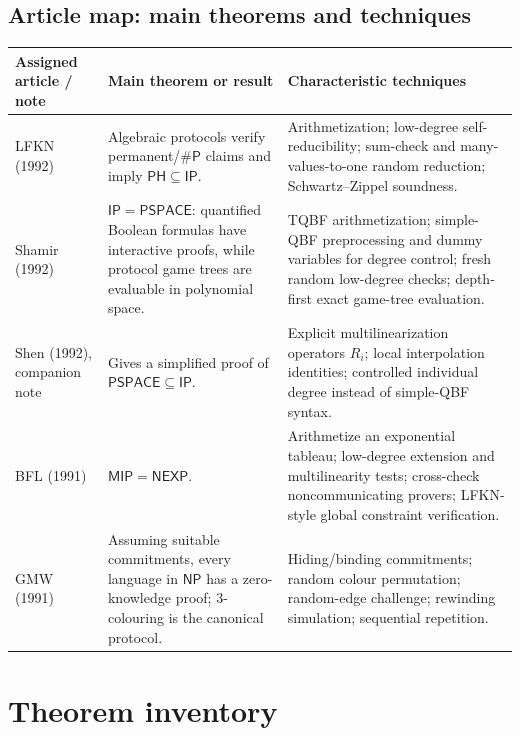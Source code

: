 \documentclass[10pt]{article}
\newcommand{\IP}{\mathsf{IP}}
\newcommand{\MIP}{\mathsf{MIP}}
\newcommand{\PSPACE}{\mathsf{PSPACE}}
\newcommand{\NEXP}{\mathsf{NEXP}}
\newcommand{\PH}{\mathsf{PH}}
\newcommand{\NP}{\mathsf{NP}}
\begin{document}
\subsection*{Article map: main theorems and techniques}
\begingroup
\scriptsize
\setlength{\tabcolsep}{3.5pt}
\renewcommand{\arraystretch}{1.08}
\begin{center}
\begin{tabularx}{\textwidth}{@{}>{\raggedright\arraybackslash}p{}>{\raggedright\arraybackslash}X>{\raggedright\arraybackslash}X@{}}
\toprule
\textbf{Assigned article / note} & \textbf{Main theorem or result} &
\textbf{Characteristic techniques}\\
\midrule
LFKN (1992) & Algebraic protocols verify permanent/$\#\mathsf P$ claims and imply
$\PH\subseteq\IP$. & Arithmetization; low-degree self-reducibility; sum-check and
many-values-to-one random reduction; Schwartz--Zippel soundness.\\
Shamir (1992) & $\IP=\PSPACE$: quantified Boolean formulas have interactive
proofs, while protocol game trees are evaluable in polynomial space. & TQBF
arithmetization; simple-QBF preprocessing and dummy variables for degree control;
fresh random low-degree checks; depth-first exact game-tree evaluation.\\
Shen (1992), companion note & Gives a simplified proof of
$\PSPACE\subseteq\IP$. & Explicit multilinearization operators $R_i$; local
interpolation identities; controlled individual degree instead of simple-QBF syntax.\\
BFL (1991) & $\MIP=\NEXP$. & Arithmetize an exponential tableau; low-degree
extension and multilinearity tests; cross-check noncommunicating provers; LFKN-style
global constraint verification.\\
GMW (1991) & Assuming suitable commitments, every language in $\NP$ has a
zero-knowledge proof; 3-colouring is the canonical protocol. & Hiding/binding
commitments; random colour permutation; random-edge challenge; rewinding simulation;
sequential repetition.\\
\bottomrule
\end{tabularx}
\end{center}
\endgroup

\section*{Theorem inventory}
\begingroup
\small
\end{document}
